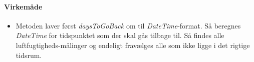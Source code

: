 \paragraph{Virkemåde}
\begin{itemize}
	\item Metoden laver først \textit{daysToGoBack} om til \textit{DateTime}-format. Så beregnes \textit{DateTime} for tidspunktet som der skal gås tilbage til. Så findes alle luftfugtigheds-målinger og endeligt fravælges alle som ikke ligge i det rigtige tidsrum.
\end{itemize}






